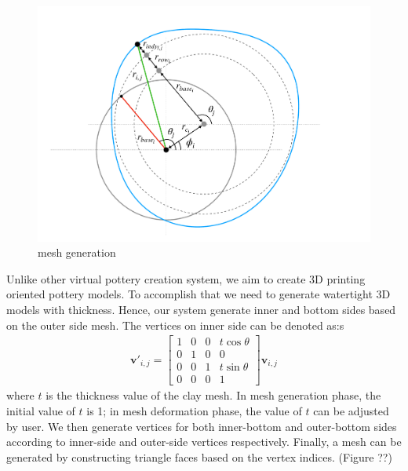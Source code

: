 \begin{figure}
  \includegraphics[width=\textwidth]{fig4.pdf}
\caption{mesh generation}
\label{fig:1}       %
\end{figure}

Unlike other virtual pottery creation system, we aim to create 3D printing oriented pottery models. To accomplish that we need to generate watertight 3D models with thickness. Hence, our system generate inner and bottom sides based on the outer side mesh. The vertices on inner side can be denoted as:s
\begin{equation}
\begin{split}
\mathbf{v'}_{i,j} = 
\begin{bmatrix}
1 & 0 & 0 & t\cos\theta \\
0 & 1 & 0 & 0\\ 
0 & 0 & 1 & t\sin\theta \\
0 & 0 & 0 & 1 
\end{bmatrix}
\mathbf{v}_{i,j}
\end{split}
\end{equation}
where $t$ is the thickness value of the clay mesh. In mesh generation phase, the initial value of $t$ is 1; in mesh deformation phase, the value of $t$ can be adjusted by user.
We then generate vertices for both inner-bottom and outer-bottom sides according to inner-side and outer-side vertices respectively. Finally, a mesh can be generated by constructing triangle faces based on the vertex indices. (Figure ??)



